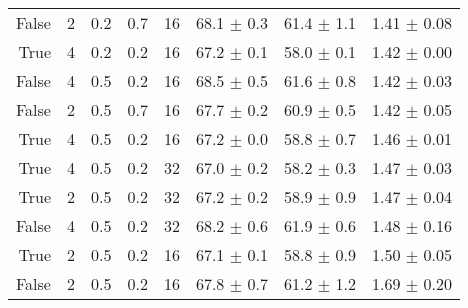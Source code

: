 \begin{table}[h]
\begin{tabular}{rrllrlll}
False & 2 & 0.2 & 0.7 & 16 & 68.1 $\pm$ 0.3 & 61.4 $\pm$ 1.1 & 1.41 $\pm$ 0.08 \\
True & 4 & 0.2 & 0.2 & 16 & 67.2 $\pm$ 0.1 & 58.0 $\pm$ 0.1 & 1.42 $\pm$ 0.00 \\
False & 4 & 0.5 & 0.2 & 16 & 68.5 $\pm$ 0.5 & 61.6 $\pm$ 0.8 & 1.42 $\pm$ 0.03 \\
False & 2 & 0.5 & 0.7 & 16 & 67.7 $\pm$ 0.2 & 60.9 $\pm$ 0.5 & 1.42 $\pm$ 0.05 \\
True & 4 & 0.5 & 0.2 & 16 & 67.2 $\pm$ 0.0 & 58.8 $\pm$ 0.7 & 1.46 $\pm$ 0.01 \\
True & 4 & 0.5 & 0.2 & 32 & 67.0 $\pm$ 0.2 & 58.2 $\pm$ 0.3 & 1.47 $\pm$ 0.03 \\
True & 2 & 0.5 & 0.2 & 32 & 67.2 $\pm$ 0.2 & 58.9 $\pm$ 0.9 & 1.47 $\pm$ 0.04 \\
False & 4 & 0.5 & 0.2 & 32 & 68.2 $\pm$ 0.6 & 61.9 $\pm$ 0.6 & 1.48 $\pm$ 0.16 \\
True & 2 & 0.5 & 0.2 & 16 & 67.1 $\pm$ 0.1 & 58.8 $\pm$ 0.9 & 1.50 $\pm$ 0.05 \\
False & 2 & 0.5 & 0.2 & 16 & 67.8 $\pm$ 0.7 & 61.2 $\pm$ 1.2 & 1.69 $\pm$ 0.20 \\
\bottomrule
\end{tabular}
\end{table}
